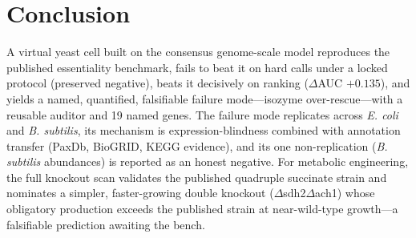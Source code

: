 \documentclass[12pt]{article}
\begin{document}
\section{Conclusion}
A virtual yeast cell built on the consensus genome-scale model reproduces
the published essentiality benchmark, fails to beat it on hard calls under
a locked protocol (preserved negative), beats it decisively on ranking
($\Delta$AUC $+0.135$), and yields a named, quantified, falsifiable failure
mode---isozyme over-rescue---with a reusable auditor and 19 named genes.
The failure mode replicates across \emph{E. coli} and \emph{B.
subtilis}, its mechanism is expression-blindness combined with
annotation transfer (PaxDb, BioGRID, KEGG evidence), and its one
non-replication (\emph{B. subtilis} abundances) is reported as an
honest negative. For metabolic engineering, the full knockout scan
validates the published quadruple succinate strain and nominates a
simpler, faster-growing double knockout ($\Delta$sdh2$\Delta$ach1)
whose obligatory production exceeds the published strain at
near-wild-type growth---a falsifiable prediction awaiting the bench.
\end{document}
